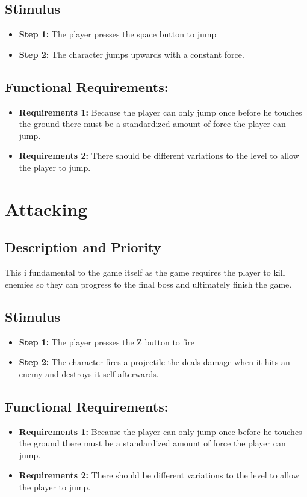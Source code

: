 \subsection{Stimulus}
\begin{itemize}
    \item \textbf{Step 1:} The player presses the space button to jump
    \item \textbf{Step 2:} The character jumps upwards with a constant force.
\end{itemize}
\subsection{Functional Requirements:}
\begin{itemize}
    \item \textbf{Requirements 1:} Because the player can only jump once before he touches the ground there must be a standardized amount of force the player can jump.
    \item \textbf{Requirements 2:} There should be different variations to the level to allow the player to jump.
\end{itemize}

\section{Attacking}
\subsection{Description and Priority}
This i fundamental to the game itself as the game requires the player to kill enemies so they can progress to the final boss and ultimately finish the game.
\subsection{Stimulus}
\begin{itemize}
    \item \textbf{Step 1:} The player presses the Z button to fire
    \item \textbf{Step 2:} The character fires a projectile the deals damage when it hits an enemy and destroys it self afterwards.
\end{itemize}
\subsection{Functional Requirements:}
\begin{itemize}
    \item \textbf{Requirements 1:} Because the player can only jump once before he touches the ground there must be a standardized amount of force the player can jump.
    \item \textbf{Requirements 2:} There should be different variations to the level to allow the player to jump.
\end{itemize}

